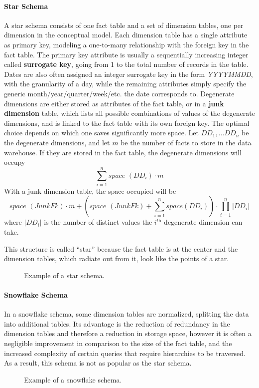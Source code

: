 \paragraph{Star Schema} A star schema consists of one fact table and a set of dimension tables, one per dimension in the conceptual model. Each dimension table has a single attribute as primary key, modeling a one-to-many relationship with the foreign key in the fact table. The primary key attribute is usually a sequentially increasing integer called \textbf{surrogate key}, going from 1 to the total number of records in the table. Dates are also often assigned an integer surrogate key in the form \textit{YYYYMMDD}, with the granularity of a day, while the remaining attributes simply specify the generic month/year/quarter/week/etc. the date corresponds to. Degenerate dimensions are either stored as attributes of the fact table, or in a \textbf{junk dimension} table, which lists all possible combinations of values of the degenerate dimensions, and is linked to the fact table with its own foreign key. The optimal choice depends on which one saves significantly more space. Let $DD_1, \ldots DD_n$ be the degenerate dimensions, and let $m$ be the number of facts to store in the data warehouse. If they are stored in the fact table, the degenerate dimensions will occupy
\[
    \sum_{i=1}^{n} \textit{space }(DD_i) \cdot m
\]
With a junk dimension table, the space occupied will be
\[
    \textit{space }({JunkFk}) \cdot m + (\textit{space }(JunkFk) + \sum_{i=1}^{n} \textit{space}(DD_i)) \cdot \prod_{i=1}^{n} |DD_i|
\]
where $|DD_i|$ is the number of distinct values the $i^{\textit{th}}$ degenerate dimension can take.

This structure is called ``star'' because the fact table is at the center and the dimension tables, which radiate out from it, look like the points of a star.
\begin{figure}[ht]
    \centering
    
    \caption{Example of a star schema.}
\end{figure}

\paragraph{Snowflake Schema} In a snowflake schema, some dimension tables are normalized, splitting the data into additional tables. Its advantage is the reduction of redundancy in the dimension tables and therefore a reduction in storage space, however it is often a negligible improvement in comparison to the size of the fact table, and the increased complexity of certain queries that require hierarchies to be traversed. As a result, this schema is not as popular as the star schema.
\begin{figure}[ht]
    \centering
    
    \caption{Example of a snowflake schema.}
\end{figure}

